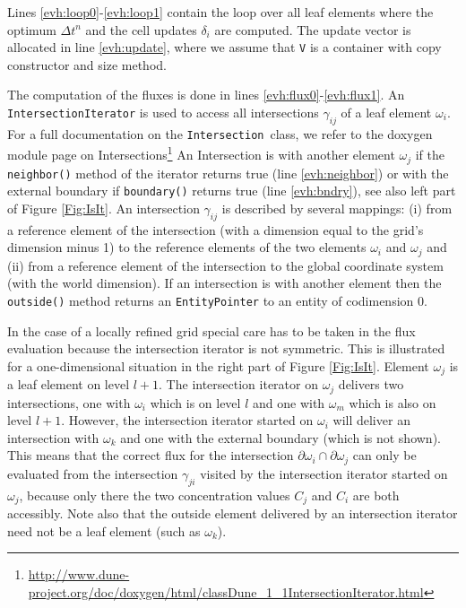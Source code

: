 \documentclass[11pt,a4paper,headinclude,footinclude,DIV16,normalheadings]{scrreprt}
\begin{document}
Lines \ref{evh:loop0}-\ref{evh:loop1} contain the loop over all leaf
elements where the optimum $\Delta t^n$ and the cell updates
$\delta_i$ are computed. The update vector is allocated in line
\ref{evh:update}, where we assume that \lstinline!V! is a container
with copy constructor and size method.

The computation of the fluxes is done in lines
\ref{evh:flux0}-\ref{evh:flux1}. An \lstinline!IntersectionIterator!
is used to access all intersections $\gamma_{ij}$ of a leaf element
$\omega_i$. For a full documentation on the
\lstinline!Intersection!\ class, we refer to the doxygen module page on 
Intersections\footnote{\url{http://www.dune-project.org/doc/doxygen/html/classDune_1_1IntersectionIterator.html}}
An Intersection is with another element $\omega_j$ if the
\lstinline!neighbor()! method of the iterator returns true (line
\ref{evh:neighbor}) or with the external boundary if
\lstinline!boundary()! returns true (line \ref{evh:bndry}), see also
left part of Figure \ref{Fig:IsIt}. An intersection $\gamma_{ij}$ is
described by several mappings: (i) from a reference element of the
intersection (with a dimension equal to the grid's dimension minus 1)
to the reference elements of the two elements $\omega_i$ and
$\omega_j$ and (ii) from a reference element of the intersection to
the global coordinate system (with the world dimension). If an
intersection is with another element then the \lstinline!outside()!
method returns an \lstinline!EntityPointer! to an entity of
codimension 0.

In the case of a locally refined grid special care has to be taken in
the flux evaluation because the intersection iterator is not
symmetric. This is illustrated for a one-dimensional situation in
the right part of Figure \ref{Fig:IsIt}. Element
$\omega_j$ is a leaf element on level $l+1$. The intersection iterator
on $\omega_j$ delivers two intersections, one with $\omega_i$ which is
on level $l$ and one with $\omega_m$ which is also on level
$l+1$. However, the intersection iterator started on $\omega_i$ will
deliver an intersection with $\omega_k$ and one with the external
boundary (which is not shown). This means that the correct flux for
the intersection $\partial\omega_i\cap\partial\omega_j$ can only be
evaluated from the intersection $\gamma_{ji}$ visited by the
intersection iterator started on $\omega_j$, because only there the
two concentration values $C_j$ and $C_i$ are both accessibly. Note
also that the outside element delivered by an intersection
iterator need not be a leaf element (such as $\omega_k$). 
\end{document}
